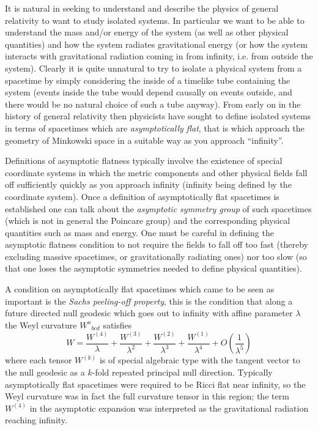 \documentclass[a4paper,12pt]{amsart}
\theoremstyle{remark}
\begin{document}
It is natural in seeking to understand and describe the physics of general
relativity to want to study isolated systems. In particular we want
to be able to understand the mass and/or energy of the system (as
well as other physical quantities) and how the system radiates gravitational energy (or how the system interacts with gravitational radiation coming in from infinity, i.e. from outside the system). Clearly it is quite unnatural to try to isolate a physical system from a spacetime by simply considering the inside of a timelike tube containing the system
(events inside the tube would depend causally on events outside, and
there would be no natural choice of such a tube anyway). From early
on in the history of general relativity then physicists have sought
to define isolated systems in terms of spacetimes which are \emph{asymptotically flat}, that is which approach the geometry of Minkowski space in a suitable way as you approach ``infinity''.

Definitions of asymptotic flatness typically involve the existence
of special coordinate systems in which the metric components and other
physical fields fall off sufficiently quickly as you approach infinity
(infinity being defined by the coordinate system). Once a definition
of asymptotically flat spacetimes is established one can talk about
the \emph{asymptotic symmetry group} of such spacetimes (which is
not in general the Poincare group) and the corresponding physical
quantities such as mass and energy. One must be careful in defining
the asymptotic flatness condition to not require the fields to fall
off too fast (thereby excluding massive spacetimes, or gravitationally
radiating ones) nor too slow (so that one loses the asymptotic symmetries
needed to define physical quantities). 

A condition on asymptotically flat spacetimes which came to be seen
as important is the \emph{Sachs peeling-off property}, this is the
condition that along a future directed null geodesic which goes out
to infinity with affine parameter $\lambda$ the Weyl curvature $W^{a}{_{bcd}}$
satisfies
\[
W=\frac{W^{(4)}}{\lambda}+\frac{W^{(3)}}{\lambda^{2}}+\frac{W^{(2)}}{\lambda^{3}}+\frac{W^{(1)}}{\lambda^{4}}+O\left(\frac{1}{\lambda^{5}}\right)
\]
where each tensor $W^{(k)}$ is of special algebraic type with the
tangent vector to the null geodesic as a $k$-fold repeated principal
null direction. Typically asymptotically flat spacetimes were required
to be Ricci flat near infinity, so the Weyl curvature was in fact
the full curvature tensor in this region; the term $W^{(4)}$ in the
asymptotic expansion was interpreted as the gravitational radiation
reaching infinity.
\end{document}
